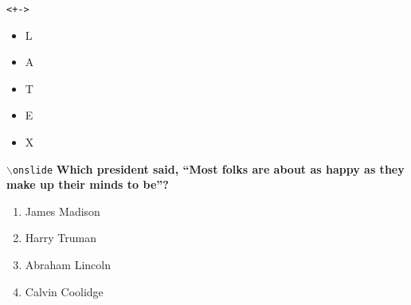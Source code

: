\documentclass{beamer}
\begin{document}
\begin{frame}{\texttt{\textless+-\textgreater}}
\begin{itemize}[<+->]
\item L
\item A
\item T
\item E
\item X
\end{itemize}
\end{frame}

\begin{frame}{\texttt{$\backslash$onslide}}
\textbf{Which president said, ``Most folks are about as happy as they make up their minds to be''?} \\
\begin{enumerate}[A]
\item<2-5> James Madison
\item<3-5> Harry Truman
\item<4-> Abraham Lincoln
\item<5-5> Calvin Coolidge
\end{enumerate}
\\
\\
\\
\\
\\    
\end{frame}

% 
% 
\end{document}
